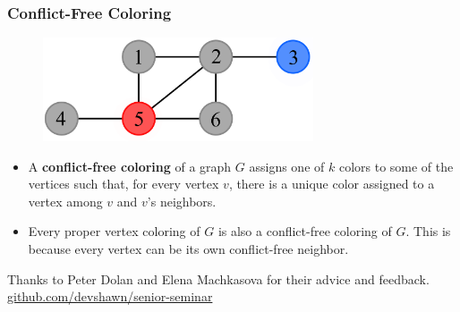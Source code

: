 \documentclass[xcolor=dvipsnames,aspectratio=1610]{beamer}
\begin{document}
  \begin{frame}
    \frametitle{Conflict-Free Coloring}

    \begin{figure}[h]
      \centering
      \includegraphics[width=8cm]{../figures/example-cfcp.pdf}
    \end{figure}

    \vfill

    \begin{itemize}
      \item A \textbf{conflict-free coloring} of a graph $G$ assigns one of $k$ colors to some of the vertices such that, for every vertex $v$, there is a unique color assigned to a vertex among $v$ and $v$'s neighbors.
      \item Every proper vertex coloring of $G$ is also a conflict-free coloring of $G$. This is because every vertex can be its own conflict-free neighbor.
    \end{itemize}
  \end{frame}

  \begin{frame}[standout]
    \centering
    Thanks to Peter Dolan and Elena Machkasova for their advice and feedback.
    \vfill
    \href{https://github.com/devshawn/senior-seminar}{github.com/devshawn/senior-seminar}
    \vfill
    \ccbyncsa{}
  \end{frame}
\end{document}
